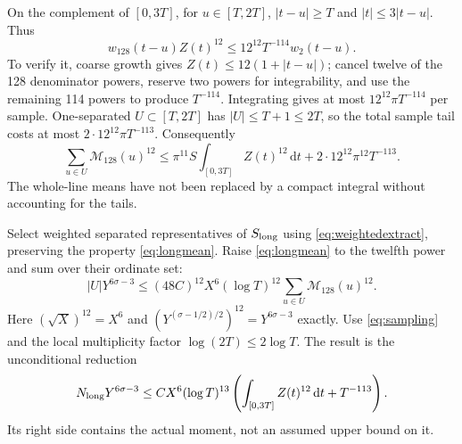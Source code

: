 \documentclass[11pt,a4paper]{article}
\numberwithin{equation}{section}
\theoremstyle{definition}
\newcommand{\dd}{\,\mathrm d}
\newcommand{\zabs}{Z}
\begin{document}
On the complement of $[0,3T]$, for $u\in[T,2T]$,
$|t-u|\ge T$ and $|t|\le3|t-u|$. Thus
\begin{equation*}
 w_{128}(t-u)\zabs(t)^{12}
       \le12^{12}T^{-114}w_2(t-u).
\end{equation*}
To verify it, coarse growth gives
$\zabs(t)\le12(1+|t-u|)$; cancel twelve of the 128 denominator powers,
reserve two powers for integrability, and use the remaining 114 powers to
produce $T^{-114}$. Integrating gives at most
$12^{12}\pi T^{-114}$ per sample. One-separated $U\subset[T,2T]$ has
$|U|\le T+1\le2T$, so the total sample tail costs at most
$2\cdot12^{12}\pi T^{-113}$.
Consequently
\begin{equation}\label{eq:sampling}
 \sum_{u\in U}\mathcal M_{128}(u)^{12}
 \le\pi^{11}S\int_{[0,3T]}\zabs(t)^{12}\dd t
            +2\cdot12^{12}\pi^{12}T^{-113}.
\end{equation}
The whole-line means have not been replaced by a compact integral without
accounting for the tails.

Select weighted separated representatives of $S_{\rm long}$ using
\eqref{eq:weightedextract}, preserving the property \eqref{eq:longmean}.
Raise \eqref{eq:longmean} to the twelfth power and sum over their ordinate set:
\[
 |U|Y^{6\sigma-3}\le(48C)^{12}X^6(\log T)^{12}
                              \sum_{u\in U}\mathcal M_{128}(u)^{12}.
\]
Here $(\sqrt X)^{12}=X^6$ and
$(Y^{(\sigma-1/2)/2})^{12}=Y^{6\sigma-3}$ exactly.
Use \eqref{eq:sampling} and the local multiplicity factor
$\log(2T)\le2\log T$. The result is the unconditional reduction
\begin{equation}\label{eq:longraw}
 N_{\rm long}Y^{6\sigma-3}
 \le C X^6(\log T)^{13}
          \left(\int_{[0,3T]}\zabs(t)^{12}\dd t+T^{-113}\right).
\end{equation}
Its right side contains the actual moment, not an assumed upper bound on it.
\end{document}

